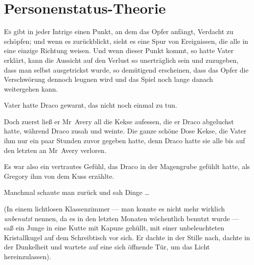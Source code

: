 \chapter{Personenstatus-Theorie}

\lettrine{E}{s} gibt in jeder Intrige einen Punkt, an dem das Opfer anfängt, Verdacht zu schöpfen; und wenn es zurückblickt, sieht es eine Spur von Ereignissen, die alle in eine einzige Richtung weisen. Und wenn dieser Punkt kommt, so hatte Vater erklärt, kann die Aussicht auf den Verlust so unerträglich sein und zuzugeben, dass man selbst ausgetrickst wurde, so demütigend erscheinen, dass das Opfer die Verschwörung dennoch leugnen wird und das Spiel noch lange danach weitergehen kann.

Vater hatte Draco gewarnt, das nicht noch einmal zu tun.

Doch zuerst ließ er Mr~Avery all die Kekse aufessen, die er Draco abgeluchst hatte, während Draco zusah und weinte. Die ganze schöne Dose Kekse, die Vater ihm nur ein paar Stunden zuvor gegeben hatte, denn Draco hatte sie alle bis auf den letzten an Mr~Avery verloren.

Es war also ein vertrautes Gefühl, das Draco in der Magengrube gefühlt hatte, als Gregory ihm von dem Kuss erzählte.

Manchmal schaute man zurück und sah Dinge …

(In einem lichtlosen Klassenzimmer — man konnte es nicht mehr wirklich \emph{unbenutzt} nennen, da es in den letzten Monaten wöchentlich benutzt wurde — saß ein Junge in eine Kutte mit Kapuze gehüllt, mit einer unbeleuchteten Kristallkugel auf dem Schreibtisch vor sich. Er dachte in der Stille nach, dachte in der Dunkelheit und wartete auf eine sich öffnende Tür, um das Licht hereinzulassen).

